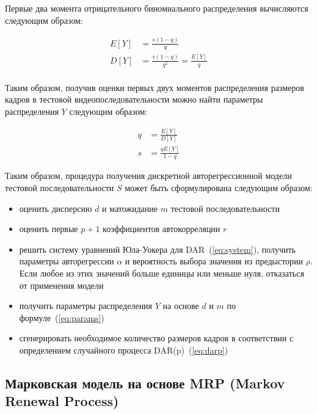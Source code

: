 Первые два момента отрицательного биномиального распределения
вычисляются следующим образом:

\begin{equation}
    \begin{aligned}
        E[Y] &= \frac{s(1-q)}{q} \\
        D[Y] &= \frac{s(1-q)}{q^2} = \frac{E[Y]}{q} \\
    \end{aligned}
\end{equation}

Таким образом, получив оценки первых двух моментов распределения
размеров кадров в тестовой видеопоследовательности можно
найти параметры распределения $Y$ следующим образом:

\begin{equation}
    \begin{aligned}
        q &= \frac{E[Y]}{D[Y]} \\
        s &= \frac{qE[Y]}{1 - q}
    \end{aligned}
    \label{eq:params}
\end{equation}

Таким образом, процедура получения дискретной авторегрессионной
модели тестовой последовательности $S$ может быть сформулирована
следующим образом:

\begin{itemize}
    \item оценить дисперсию $d$ и матожидание $m$ тестовой последовательности
    \item оценить первые $p + 1$ коэффициентов автокорреляции $r$
    \item решить систему уравнений Юла-Уокера для DAR~(\ref{eq:system}),
        получить параметры авторегрессии $\alpha$ и вероятность выбора
        значения из предыстории $\rho$. Если любое из этих значений
        больше единицы или меньше нуля, отказаться от применения модели
    \item получить параметры распределения $Y$ на основе $d$ и $m$
        по формуле~(\ref{eq:params})
    \item сгенерировать необходимое количество размеров кадров
        в соответствии с определением случайного процесса DAR(p)~(\ref{eq:darp})
\end{itemize}

\newpage
\subsection{Марковская модель на основе MRP (Markov Renewal Process)}
\label{sse:marksimple}

